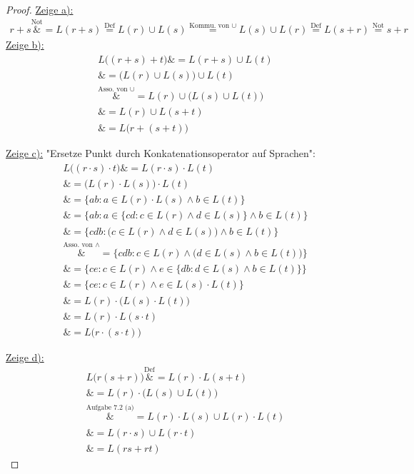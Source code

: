 \documentclass[12pt,a4paper]{article}
\begin{document}
\begin{proof}
	\underline{Zeige a):}
	\begin{align*}
		r+s
		\overset{\text{Not}}&=		
		L(r+s)
		\overset{\text{Def}}=
		L(r)\cup L(s)
		\overset{\text{Kommu. von }\cup}=
		L(s)\cup L(r)
		\overset{\text{Def}}=
		L(s+r)
		\overset{\text{Not}}=	
		s+r
	\end{align*}
	\underline{Zeige b):}
	\begin{align*}
		L\big((r+s)+t\big)
		\overset{\text{}}&=
		L(r+s)\cup L(t)\\
		\overset{\text{}}&=
		\big(L(r)\cup L(s)\big)\cup L(t)\\
		\overset{\text{Asso. von }\cup}&=
		L(r)\cup\big(L(s)\cup L(t)\big)\\
		\overset{\text{}}&=
		L(r)\cup L(s+t)\\
		\overset{\text{}}&=
		L\big(r+(s+t)\big)
	\end{align*}
	
	\underline{Zeige c):} "Ersetze Punkt durch Konkatenationsoperator auf Sprachen":
	\begin{align*}
		L\big((r\cdot s)\cdot t\big)
		\overset{\text{}}&=
		L(r\cdot s)\cdot L(t)\\
		\overset{\text{}}&=
		\big(L(r)\cdot L(s)\big)\cdot L(t)\\
		\overset{\text{}}&=
		\big\lbrace ab:a\in L(r)\cdot L(s)\wedge b\in L(t)\big\rbrace\\
		\overset{\text{}}&=
		\Big\lbrace ab:a\in\big\lbrace cd:c\in L(r)\wedge d\in L(s)\big\rbrace\wedge b\in L(t)\Big\rbrace\\
		\overset{\text{}}&=
		\Big\lbrace cdb:\big(c\in L(r)\wedge d\in L(s)\big)\wedge b\in L(t)\Big\rbrace\\
		\overset{\text{Asso. von }\wedge}&=
		\Big\lbrace cdb:c\in L(r)\wedge\big(d\in L(s)\wedge b\in L(t)\big)\Big\rbrace\\
		\overset{\text{}}&=
		\Big\lbrace ce:c\in L(r)\wedge e\in\big\lbrace db:d\in L(s)\wedge b\in L(t)\big\rbrace\Big\rbrace\\
		\overset{\text{}}&=
		\big\lbrace ce:c\in L(r)\wedge e\in L(s)\cdot L(t)\big\rbrace\\
		\overset{\text{}}&=
		L(r)\cdot\big(L(s)\cdot L(t)\big)\\
		\overset{\text{}}&=
		L(r)\cdot L(s\cdot t)\\
		\overset{\text{}}&=
		L\big(r\cdot(s\cdot t)\big)
	\end{align*}
	
	\underline{Zeige d):}
	\begin{align*}
		L\big(r(s+r)\big)
		\overset{\text{Def}}&=
		L(r)\cdot L(s+t)\\
		\overset{\text{}}&=
		L(r)\cdot\big(L(s)\cup L(t)\big)\\
		\overset{\text{Aufgabe 7.2 (a)}}&=
		L(r)\cdot L(s)\cup L(r)\cdot L(t)\\
		\overset{\text{}}&=
		L(r\cdot s)\cup L(r\cdot t)\\
		\overset{\text{}}&=
		L(rs+rt)
	\end{align*}		
	

\end{proof}
\end{document}
